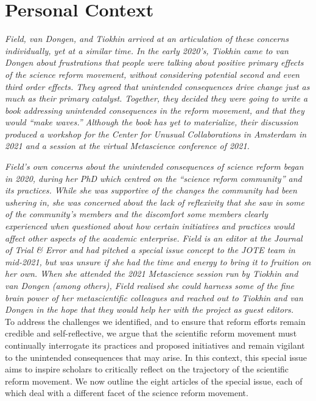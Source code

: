 \documentclass[authordate, editorial, noabstract, issue]{jote-new-article}
\begin{document}
\section{Personal Context}



\emph{Field, van Dongen, and Tiokhin arrived at an articulation of these concerns individually, yet at a similar time. In the early 2020's, Tiokhin came to van Dongen about frustrations that people were talking about positive primary effects of the science reform movement, without considering potential second and even third order effects. They agreed that unintended consequences drive change just as much as their primary catalyst. Together, they decided they were going to write a book addressing unintended consequences in the reform movement, and that they would “make waves.” Although the book has yet to materialize, their discussion produced a workshop for the Center for Unusual Collaborations in Amsterdam in 2021 and a session at the virtual Metascience conference of 2021. }



\emph{Field's own concerns about the unintended consequences of science reform began in 2020, during her PhD which centred on the “science reform community” and its practices. While she was supportive of the changes the community had been ushering in, she was concerned about the lack of reflexivity that she saw in some of the community's members and the discomfort some members clearly experienced when questioned about how certain initiatives and practices would affect other aspects of the academic enterprise. Field is an editor at the Journal of Trial \& Error and had pitched a special issue concept to the JOTE team in mid-2021, but was unsure if she had the time and energy to bring it to fruition on her own. When she attended the 2021 Metascience session run by Tiokhin and van Dongen (among others), Field realised she could harness some of the fine brain power of her metascientific colleagues and reached out to Tiokhin and van Dongen in the hope that they would help her with the project as guest editors. }\\







To address the challenges we identified, and to ensure that reform efforts remain credible and self-reflective, we argue that the scientific reform movement must continually interrogate its practices and proposed initiatives and remain vigilant to the unintended consequences that may arise. In this context, this special issue aims to inspire scholars to critically reflect on the trajectory of the scientific reform movement. We now outline the eight articles of the special issue, each of which deal with a different facet of the science reform movement.
\end{document}
